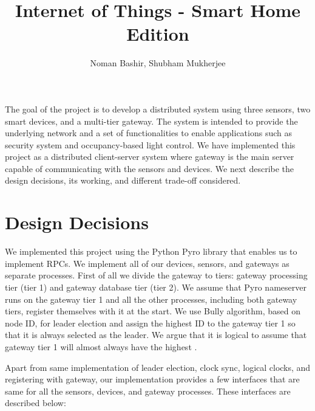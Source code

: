 \documentclass[12pt]{article}
\begin{document}
 
\title{Internet of Things - Smart Home Edition}%
\author{Noman Bashir, Shubham Mukherjee}
\maketitle


The goal of the project is to develop a distributed system using 
three sensors, two smart devices, and a multi-tier gateway. 
The system is intended to provide the underlying network and 
a set of functionalities to enable applications such as security 
system and occupancy-based light control. 
We have implemented this project as a distributed client-server 
system where gateway is the main server capable of communicating 
with the sensors and devices. 
We next describe the design decisions, its working, and different trade-off
considered. 

\section{Design Decisions}
We implemented this project using the Python Pyro library that 
enables us to implement RPCs. We implement all of our devices, 
sensors, and gateways as separate processes. 
First of all we divide the gateway to tiers: gateway processing tier (tier 1) 
and gateway database tier (tier 2). 
We assume that Pyro nameserver runs on the gateway tier 1 and all 
the other processes, including both gateway tiers, register themselves 
with it at the start. 
We use Bully algorithm, based on node ID, for leader election and assign
the highest ID to the gateway tier 1 so that it is always selected as the leader.
We argue that it is logical to assume that gateway tier 1 will almost always have 
the highest . 

Apart from same implementation 
of leader election, clock sync, logical clocks, and registering with gateway, 
our implementation provides a few interfaces that are same for all the sensors, devices, 
and gateway processes. These interfaces are described below: 
\end{document}
